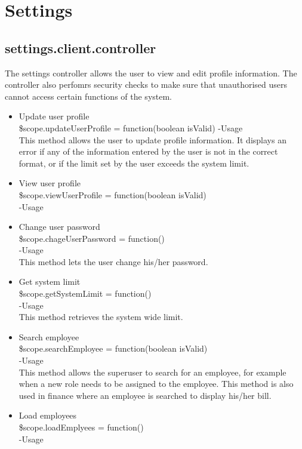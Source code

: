 \documentclass[a4paper,12pt]{article}
\begin{document}
 \section{Settings}
 \subsection{settings.client.controller}
 The settings controller allows the user to view and edit profile information. The controller also perfomrs security checks to make sure that unauthorised users cannot access certain functions of the system. 
 \begin{itemize}
 \item Update user profile\\
 \$scope.updateUserProfile = function(boolean isValid)
 -Usage\\
 This method allows the user to update profile information. It displays an error if any of the information entered by the user is not in the correct format, or if the limit set by the user exceeds the system limit.
\item View user profile\\
 \$scope.viewUserProfile = function(boolean isValid)\\
-Usage\\

\item Change user password\\
 \$scope.chageUserPassword = function()\\
-Usage\\
This method lets the user change his/her password.

\item Get system limit\\
 \$scope.getSystemLimit = function()\\
-Usage\\
This method retrieves the system wide limit.

\item Search employee\\
 \$scope.searchEmployee = function(boolean isValid)\\
-Usage\\
This method allows the superuser to search for an employee, for example when a new role needs to be assigned to the employee.
This method is also used in finance where an employee is searched to display his/her bill.

\item Load employees\\
 \$scope.loadEmplyees = function()\\
-Usage\\


\end{itemize}
\end{document}
